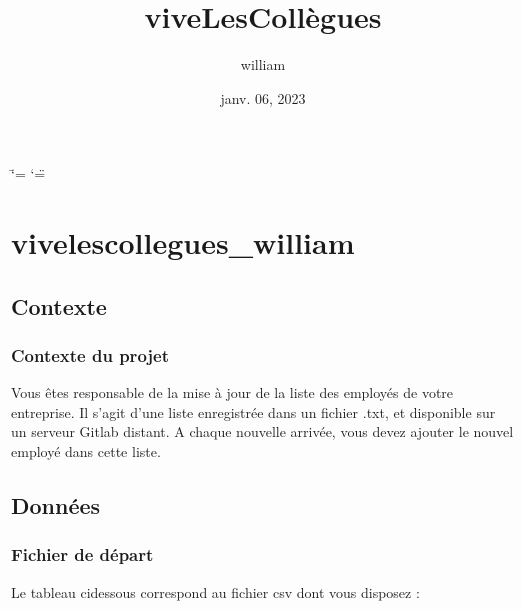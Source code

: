\documentclass[letterpaper,10pt,french]{sphinxmanual}
\title{viveLesCollègues}
\date{janv. 06, 2023}
\author{william}
\begin{document}
\ifdefined\shorthandoff
  \ifnum\catcode`\=\string=\active\shorthandoff{=}\fi
  \ifnum\catcode`\"=\active{}\fi
\fi

\pagestyle{empty}
\sphinxmaketitle
\pagestyle{plain}
\sphinxtableofcontents
\pagestyle{normal}
\label{\detokenize{index::doc}}



\chapter{vivelescollegues\_william}
\label{\detokenize{modules:vivelescollegues-william}}\label{\detokenize{modules::doc}}

\section{Contexte}
\label{\detokenize{contexte:contexte}}\label{\detokenize{contexte::doc}}

\subsection{Contexte du projet}
\label{\detokenize{contexte:contexte-du-projet}}\label{\detokenize{contexte:module-contexte.contexte}}
\sphinxAtStartPar
Vous êtes responsable de la mise à jour de la liste des employés de votre entreprise. 
Il s’agit d’une liste enregistrée dans un fichier .txt, et disponible sur un serveur Gitlab distant. 
A chaque nouvelle arrivée, vous devez ajouter le nouvel employé dans cette liste.


\section{Données}
\label{\detokenize{datas:donnees}}\label{\detokenize{datas::doc}}

\subsection{Fichier de départ}
\label{\detokenize{datas:fichier-de-depart}}\label{\detokenize{datas:module-datas.explications}}
\sphinxAtStartPar
Le tableau ci\sphinxhyphen{}dessous correspond au fichier csv dont vous disposez :
\end{document}
